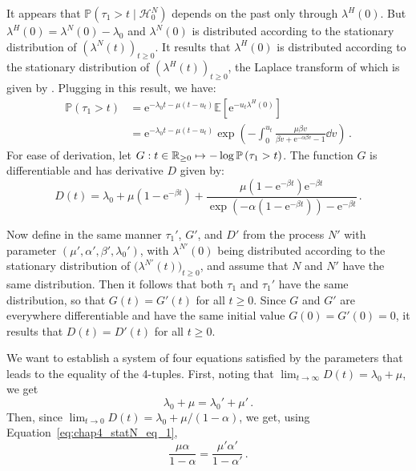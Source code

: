 \begin{subappendices}
It appears that $\mathbb P \left(\tau_1 > t \mid \mathcal H_0^N \right)$ depends on the past only through $\lambda^H(0)$.
But $\lambda^H(0) = \lambda^N(0) - \lambda_0$ and $\lambda^N(0)$ is distributed according to the stationary distribution of $\left( \lambda^N(t) \right)_{t \ge 0}$.
It results that $\lambda^H(0)$ is distributed according to the stationary distribution of $\left( \lambda^H(t) \right)_{t \ge 0}$, the Laplace transform of which is given by \textcite[Corollary 3.1]{Dassios2011}.
Plugging in this result, we have:
\begin{align*}
  \mathbb P \left(\tau_1 > t \right)
  &= \mathrm e^{-\lambda_0 t - \mu \left( t - u_t \right)} \mathbb E \left[ \mathrm e^{- u_t \lambda^H(0)} \right]\\
  &= \mathrm e^{-\lambda_0 t - \mu \left( t - u_t \right)} \exp \left( - \int_0^{u_t} \frac{\mu\beta v}{\beta v + \mathrm e^{-\alpha\beta v} - 1} \dd v \right) \,.
\end{align*}	
For ease of derivation, let $G : t \in {\mathbb R}_{\ge 0} \mapsto - \log \mathbb P \left(\tau_1 > t \right)$.
The function $G$ is differentiable and has derivative $D$ given by:
\[
D(t) = \lambda_0 + \mu \left( 1 - \mathrm e^{-\beta t} \right) + \frac{\mu \left( 1 - \mathrm e^{-\beta t} \right) \mathrm e^{-\beta t}}{\exp \left(-\alpha \left( 1 - \mathrm e^{-\beta t} \right) \right) - \mathrm e^{-\beta t}} \,.
\]

Now define in the same manner $\tau_1'$, $G'$, and $D'$ from the process $N'$ with parameter $(\mu', \alpha', \beta', \lambda_0')$, with $\lambda^{N'}(0)$ being distributed according to the stationary distribution of $\bigl( \lambda^{N'}(t) \bigr)_{t \ge 0}$,
and assume that $N$ and $N'$ have the same distribution.
Then it follows that both $\tau_1$ and $\tau_1'$ have the same distribution, so that $G(t) = G'(t)$ for all $t \ge 0$.
Since $G$ and $G'$ are everywhere differentiable and have the same initial value $G(0) = G'(0) = 0$, it results that $D(t) = D'(t)$ for all $t \ge 0$.

We want to establish a system of four equations satisfied by the parameters that leads to the equality of the 4-tuples.
First, noting that $\lim_{t \to \infty} D(t) = \lambda_0 + \mu$, we get 
\begin{equation}\label{eq:chap4_statN_eq_1}
\lambda_0 + \mu = \lambda_0' + \mu' \,.
\end{equation}
Then, since $\lim_{t \to 0} D(t) = \lambda_0 + \mu / (1 - \alpha)$, we get, using Equation~\eqref{eq:chap4_statN_eq_1},
\begin{equation}\label{eq:chap4_statN_eq_2}
\frac{\mu\alpha}{1 - \alpha} = \frac{\mu'\alpha'}{1 - \alpha'} \,.
\end{equation}


\end{subappendices}
